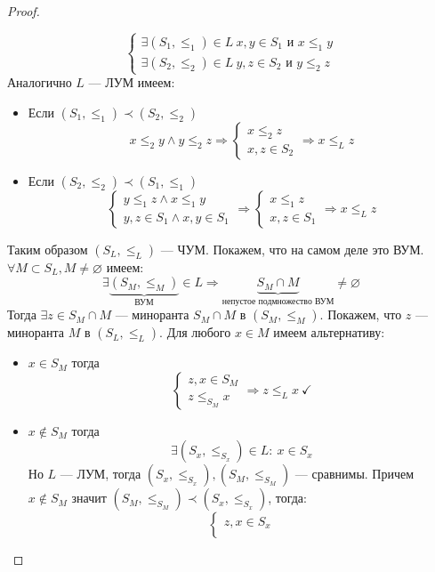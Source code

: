 \begin{proof}
\begin{enumerate}
$$		\begin{cases}
			\exists (S_1, \leq_1) \in L \ x,y \in S_1 \text{ и } x \leq_1 y \\
			\exists (S_2, \leq_2) \in L \ y,z \in S_2 \text{ и } y \leq_2 z
		\end{cases}
		$$
		Аналогично $L$ --- ЛУМ имеем:
		\begin{itemize}
			\item Если $(S_1, \leq_1) \prec (S_2, \leq_2)$
			$$
			x\leq_2 y \wedge y \leq_2 z \Rightarrow
			\begin{cases}
				x \leq_2 z \\
				x,z \in S_2 
			\end{cases} \Rightarrow x \leq_L z
			$$
			\item Если $(S_2, \leq_2) \prec (S_1, \leq_1)$
			$$
			\begin{cases}
				y \leq_1 z \wedge x \leq_1 y \\
				y,z \in S_1 \wedge x,y \in S_1
			\end{cases}
			\Rightarrow 
			\begin{cases}
				x \leq_1 z \\
				x,z \in S_1 
			\end{cases}
			\Rightarrow x \leq_L z 
			$$
		\end{itemize}
	\end{enumerate}
	Таким образом $(S_L, \leq_L)$ --- ЧУМ. Покажем, что на самом деле это ВУМ. $\forall M \subset S_L, M \neq \varnothing$ имеем:
	$$
	\exists \underbrace{(S_{M}, \leq_{M})}_{\text{ВУМ}}\in L \Rightarrow \underbrace{S_M \cap M}_{\text{непустое подмножество ВУМ}} \neq \varnothing
	$$
	Тогда $\exists z \in S_M \cap M$ --- миноранта $S_M \cap M$ в $(S_M, \leq_M)$. Покажем, что $z$ --- миноранта $M$ в $(S_L, \leq_L)$. Для любого $x \in M$ имеем альтернативу:
	\begin{itemize}
		\item $x \in S_M$ тогда 
		$$
		\begin{cases}
			z, x \in S_M \\
			z \leq_{S_M} x
		\end{cases} \Rightarrow z \leq_{L} x \ \checkmark
		$$
		\item $x \notin S_M$ тогда 
		$$
		\exists (S_x, \leq_{S_x}) \in L: \ x \in S_x 
		$$
		Но $L$ --- ЛУМ, тогда $(S_x, \leq_{S_x}), (S_M, \leq_{S_M})$ --- сравнимы. Причем $x \notin S_M$ значит $(S_M, \leq_{S_M}) \prec (S_x, \leq_{S_x})$, тогда:
		$$
		\begin{cases}
			z,x \in S_x \\

\end{cases}$$
\end{itemize}
\end{proof}
